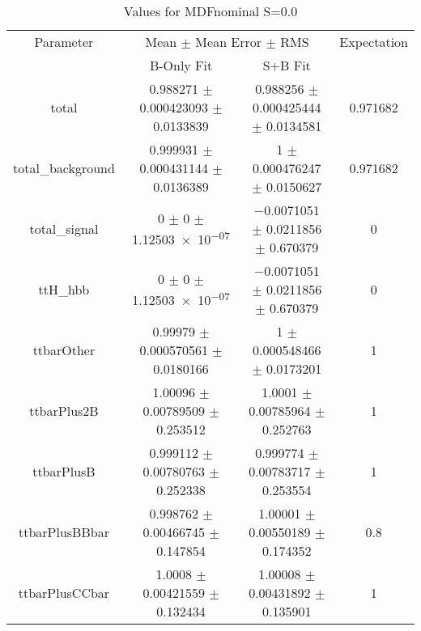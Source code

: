 \begin{table}
\centering
\caption{Values for MDFnominal S=0.0}
\begin{tabular}{cccc}
\toprule
Parameter & \multicolumn{2}{c}{Mean $\pm$ Mean Error $\pm$ RMS} & Expectation\\
 & B-Only Fit & S+B Fit & \\
\midrule
total & \num{0.988271} $\pm$ \num{0.000423093} $\pm$ \num{0.0133839} & \num{0.988256} $\pm$ \num{0.000425444} $\pm$ \num{0.0134581} & \num{0.971682}\\
total\_background & \num{0.999931} $\pm$ \num{0.000431144} $\pm$ \num{0.0136389} & \num{1} $\pm$ \num{0.000476247} $\pm$ \num{0.0150627} & \num{0.971682}\\
total\_signal & \num{0} $\pm$ \num{0} $\pm$ \num{1.12503e-07} & \num{-0.0071051} $\pm$ \num{0.0211856} $\pm$ \num{0.670379} & \num{0}\\
ttH\_hbb & \num{0} $\pm$ \num{0} $\pm$ \num{1.12503e-07} & \num{-0.0071051} $\pm$ \num{0.0211856} $\pm$ \num{0.670379} & \num{0}\\
ttbarOther & \num{0.99979} $\pm$ \num{0.000570561} $\pm$ \num{0.0180166} & \num{1} $\pm$ \num{0.000548466} $\pm$ \num{0.0173201} & \num{1}\\
ttbarPlus2B & \num{1.00096} $\pm$ \num{0.00789509} $\pm$ \num{0.253512} & \num{1.0001} $\pm$ \num{0.00785964} $\pm$ \num{0.252763} & \num{1}\\
ttbarPlusB & \num{0.999112} $\pm$ \num{0.00780763} $\pm$ \num{0.252338} & \num{0.999774} $\pm$ \num{0.00783717} $\pm$ \num{0.253554} & \num{1}\\
ttbarPlusBBbar & \num{0.998762} $\pm$ \num{0.00466745} $\pm$ \num{0.147854} & \num{1.00001} $\pm$ \num{0.00550189} $\pm$ \num{0.174352} & \num{0.8}\\
ttbarPlusCCbar & \num{1.0008} $\pm$ \num{0.00421559} $\pm$ \num{0.132434} & \num{1.00008} $\pm$ \num{0.00431892} $\pm$ \num{0.135901} & \num{1}\\
\bottomrule
\end{tabular}
\end{table}